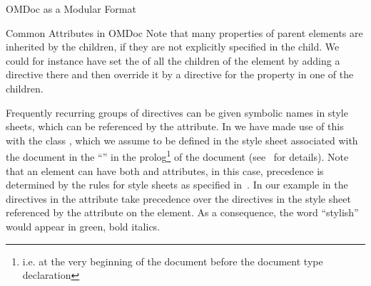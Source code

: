 \begin{tchapter}[id=spec-intro]{OMDoc as a Modular Format}
\begin{tsection}[id=common-attribs]{Common Attributes in OMDoc}
Note that many {\css} properties of parent elements are inherited by the children,
if they are not explicitly specified in the child. We could for instance have set
the {} of all the children of the {} element
by adding a directive {} there and then override it by
a directive for the property {} in one of the children.

Frequently recurring groups of {\css} directives can be given symbolic names in
{\css} style sheets, which can be referenced by the
{} attribute. In {} we have made use of
this with the class {}, which we assume to be defined in the style
sheet {} associated with the document in the ``{}'' in the prolog\footnote{i.e. at the very
  beginning of the {\xml} document before the document type declaration} of the
{\xml} document (see~\cite{Clark:assxd99} for details).  Note that an {\omdoc}
element can have both {} and {}
attributes, in this case, precedence is determined by the rules for {\css}
style sheets as specified in~\cite{BosHak:css98}. In our example in
{} the directives in the {} attribute
take precedence over the {\css} directives in the style sheet referenced by the
{} attribute on the {} element. As a
consequence, the word ``stylish'' would appear in green, bold italics.
\end{tsection}
\end{tchapter}


